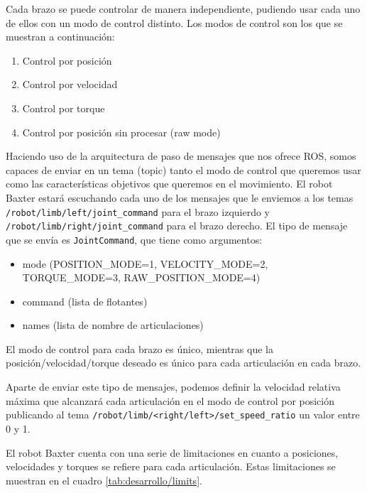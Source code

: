 Cada brazo se puede controlar de manera independiente, pudiendo usar cada uno de ellos con un modo de control distinto. Los modos de control son los que se muestran a continuación:

\begin{enumerate}
\item Control por posición
\item Control por velocidad
\item Control por torque
\item Control por posición sin procesar (raw mode)
\end{enumerate}

Haciendo uso de la arquitectura de paso de mensajes que nos ofrece ROS, somos capaces de enviar en un tema (topic) tanto el modo de control que queremos usar como las características objetivos que queremos en el movimiento. El robot Baxter estará escuchando cada uno de los mensajes que le enviemos a los temas \verb|/robot/limb/left/joint_command| para el brazo izquierdo y \verb|/robot/limb/right/joint_command| para el brazo derecho. El tipo de mensaje que se envía es \verb|JointCommand|, que tiene como argumentos:

\begin{itemize}
\item mode (POSITION\_MODE=1, VELOCITY\_MODE=2, TORQUE\_MODE=3, RAW\_POSITION\_MODE=4)
\item command (lista de flotantes)
\item names (lista de nombre de articulaciones)
\end{itemize}

El modo de control para cada brazo es único, mientras que la posición/velocidad/torque deseado es único para cada articulación en cada brazo.

Aparte de enviar este tipo de mensajes, podemos definir la velocidad relativa máxima que alcanzará cada articulación en el modo de control por posición publicando al tema \verb|/robot/limb/<right/left>/set_speed_ratio| un valor entre 0 y 1.

El robot Baxter cuenta con una serie de limitaciones en cuanto a posiciones, velocidades y torques se refiere para cada articulación. Estas limitaciones se muestran en el cuadro \ref{tab:desarrollo/limits}.

